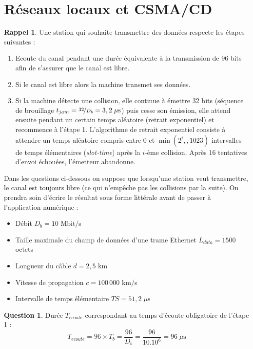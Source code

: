 \documentclass[11pt,english,french]{scrreprt}
\theoremstyle{remark}
\theoremstyle{definition}
\newtheorem{ques}{Question}[section]
\newtheorem*{rap}{Rappel}
\begin{document}
\clearpage

\section{Réseaux locaux et CSMA/CD} %
\begin{rap}
	Une station qui souhaite transmettre des données respecte les étapes suivantes :\begin{enumerate}
		\item Ecoute du canal pendant une durée équivalente à la transmission de 96 bits afin de s’assurer que le canal est libre.
		\item Si le canal est libre alors la machine transmet ses données.
		\item Si la machine détecte une collision, elle continue à émettre 32 bits (séquence de brouillage $t_{jam} = \nicefrac{32}{D_b} = 3,2\;\mu\textrm{s}$) puis cesse son émission, elle attend ensuite pendant un certain temps aléatoire (retrait exponentiel) et recommence à l’étape 1. L’algorithme de retrait exponentiel consiste à attendre un temps aléatoire compris entre 0 et $\min(2^i,,1023)$ intervalles de temps élémentaires (\emph{slot-time}) après la $i$-ème collision. Après 16 tentatives d’envoi échouées, l’émetteur abandonne.
	\end{enumerate}
\end{rap}
	  
	Dans les questions ci-dessous on suppose que lorsqu’une station veut transmettre, le canal est toujours libre (ce qui n’empêche pas les collisions par la suite). On prendra soin d’écrire le résultat sous forme littérale avant de passer à l’application numérique :\begin{itemize}
	\item Débit $D_b = 10$ Mbit/s
	\item Taille maximale du champ de données d’une trame Ethernet $L_{data} = 1500$ octets
	\item Longueur du câble $d = 2,5$ km
	\item Vitesse de propagation $c = 100\,000$ km/s
	\item Intervalle de temps élémentaire $TS = 51,2\;\mu\textrm{s}$
\end{itemize}

\begin{ques}
	Durée $T_{ecoute}$ correspondant au temps d'écoute obligatoire de l'étape 1 :\[T_{ecoute} = 96\times T_b = \frac{96}{D_b} = \frac{96}{10.10^6} = 96\;\mu\textrm{s}\]
\end{ques}
\end{document}

